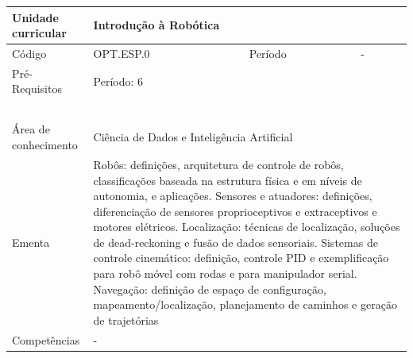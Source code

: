 \begin{quadro}[ht!]
  \centering\scriptsize
\caption{Unidade Curricular Introdução à Robótica}

\begin{tabular}{|p{2.5cm}|p{2.5cm}|p{2.5cm}|p{2.5cm}|p{2.5cm}|}\hline

  Unidade curricular & \multicolumn{4}{p{10cm}|}{ Introdução à Robótica }\\\hline
  Código & OPT.ESP.0 & Período & \multicolumn{2}{p{5cm}|}{ - }\\\hline
  Pré-Requisitos & \multicolumn{4}{p{10cm}|}{ Período: 6 } \\\hline
  \cellcolor{blue1}{ CH PRESENCIAL } &
    \cellcolor{blue1}{CH EAD Síncrona} &
    \cellcolor{blue1}{CH EAD Síncrona Mediada} &
    \cellcolor{blue1}{CH EAD Assíncrona} &
    \cellcolor{blue1}{CH APCC} \\\hline
  \cellcolor{blue1}{ 60 } &
    \cellcolor{blue1}{ 0 } &
    \cellcolor{blue1}{ 30 } &
    \cellcolor{blue1}{ 30 } &
    \cellcolor{blue1}{0} \\\hline
  \cellcolor{blue1}{ CH Teórica } &
    \cellcolor{blue1}{CH Prática} &
    \cellcolor{blue1}{CH Humanidades} &
    \cellcolor{blue1}{CH Extensão} &
    \cellcolor{blue1}{CH EAD TOTAL} \\\hline
  \cellcolor{blue1}{ 30 } &
    \cellcolor{blue1}{ 30 } &
    \cellcolor{blue1}{ 0 } &
    \cellcolor{blue1}{ 0 } &
    \cellcolor{blue1}{ 60 } \\\hline
  \cellcolor{blue1}{CARGA-HORÁRIA TOTAL} & \multicolumn{4}{p{10cm}|}{ \cellcolor{blue1}{ 60 } } \\\hline
  Área de conhecimento & \multicolumn{4}{p{10cm}|}{ Ciência de Dados e Inteligência Artificial } \\\hline
  Ementa & \multicolumn{4}{p{10cm}|}{ Robôs: definições, arquitetura de controle de robôs, classificações baseada na estrutura física e em níveis de autonomia, e aplicações. Sensores e atuadores: definições, diferenciação de sensores proprioceptivos e extraceptivos e motores elétricos. Localização: técnicas de localização, soluções de dead-reckoning e fusão de dados sensoriais. Sistemas de controle cinemático: definição, controle PID e exemplificação para robô móvel com rodas e para manipulador serial. Navegação: definição de espaço de configuração, mapeamento/localização, planejamento de caminhos e geração de trajetórias } \\\hline
  Competências & \multicolumn{4}{p{10cm}|}{ - } \\\hline


  
	\end{tabular}

\end{quadro}


